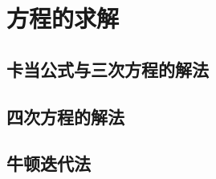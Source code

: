 
\section{方程的求解}
\label{sec:solve-high-equation}

\subsection{卡当公式与三次方程的解法}
\label{sec:solve-equation-with-3-degree}

\subsection{四次方程的解法}
\label{sec:solve-equation-with-4-degree}

\subsection{牛顿迭代法}
\label{sec:newton-iterator-method}

 


